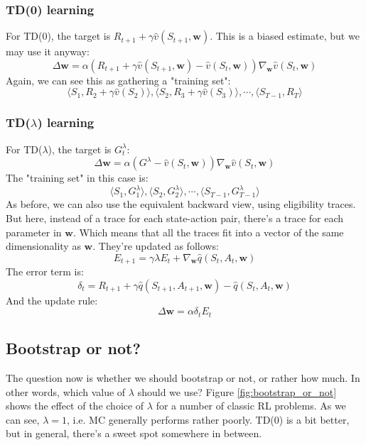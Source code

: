 \documentclass[12pt, a4paper]{article}
\numberwithin{equation}{section}
\begin{document}
\subsubsection{TD(0) learning}
For TD(0), the target is $R_{t+1}+\gamma\hat{v}(S_{t+1},\mathbf{w})$. This is a biased estimate, but we may use it anyway:
\begin{equation}
\Delta\mathbf{w}=\alpha(R_{t+1}+\gamma\hat{v}(S_{t+1},\mathbf{w})-\hat{v}(S_t,\mathbf{w}))\nabla_\mathbf{w}\hat{v}(S_t,\mathbf{w})
\end{equation}
Again, we can see this as gathering a "training set":
\begin{equation}
\langle S_1,R_2+\gamma\hat{v}(S_2)\rangle,\langle S_2,R_3+\gamma\hat{v}(S_3)\rangle,\cdots,\langle S_{T-1},R_T\rangle
\end{equation}

\subsubsection{TD($\lambda$) learning}
For TD($\lambda$), the target is $G^\lambda_t$:
\begin{equation}
\Delta\mathbf{w}=\alpha(G^\lambda-\hat{v}(S_t,\mathbf{w}))\nabla_\mathbf{w}\hat{v}(S_t,\mathbf{w})
\end{equation}
The "training set" in this case is:
\begin{equation}
\langle S_1,G^\lambda_1\rangle,\langle S_2,G^\lambda_2\rangle,\cdots,\langle S_{T-1},G^\lambda_{T-1}\rangle
\end{equation}
As before, we can also use the equivalent backward view, using eligibility traces. But here, instead of a trace for each state-action pair, there's a trace for each parameter in $\mathbf{w}$. Which means that all the traces fit into a vector of the same dimensionality as $\mathbf{w}$. They're updated as follows:
\begin{equation}
E_{t+1}=\gamma\lambda E_t+\nabla_\mathbf{w}\hat{q}(S_t,A_t,\mathbf{w})
\end{equation}
The error term is:
\begin{equation}
\delta_t=R_{t+1}+\gamma\hat{q}(S_{t+1},A_{t+1},\mathbf{w})-\hat{q}(S_t,A_t,\mathbf{w})
\end{equation}
And the update rule:
\begin{equation}
\Delta\mathbf{w}=\alpha\delta_t E_t
\end{equation}

\subsection{Bootstrap or not?}
The question now is whether we should bootstrap or not, or rather how much. In other words, which value of $\lambda$ should we use? Figure \ref{fig:bootstrap_or_not} shows the effect of the choice of $\lambda$ for a number of classic RL problems. As we can see, $\lambda=1$, i.e. MC generally performs rather poorly. TD(0) is a bit better, but in general, there's a sweet spot somewhere in between.
\end{document}
